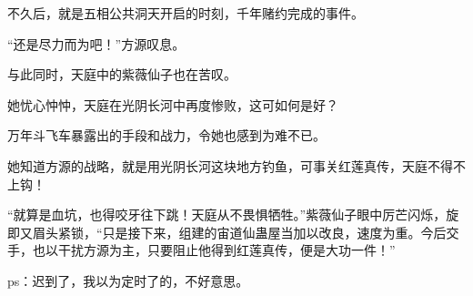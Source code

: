\begin{this_body}
不久后，就是五相公共洞天开启的时刻，千年赌约完成的事件。

“还是尽力而为吧！”方源叹息。

与此同时，天庭中的紫薇仙子也在苦叹。

她忧心忡忡，天庭在光阴长河中再度惨败，这可如何是好？

万年斗飞车暴露出的手段和战力，令她也感到为难不已。

她知道方源的战略，就是用光阴长河这块地方钓鱼，可事关红莲真传，天庭不得不上钩！

“就算是血坑，也得咬牙往下跳！天庭从不畏惧牺牲。”紫薇仙子眼中厉芒闪烁，旋即又眉头紧锁，“只是接下来，组建的宙道仙蛊屋当加以改良，速度为重。今后交手，也以干扰方源为主，只要阻止他得到红莲真传，便是大功一件！”

ps：迟到了，我以为定时了的，不好意思。

\end{this_body}

